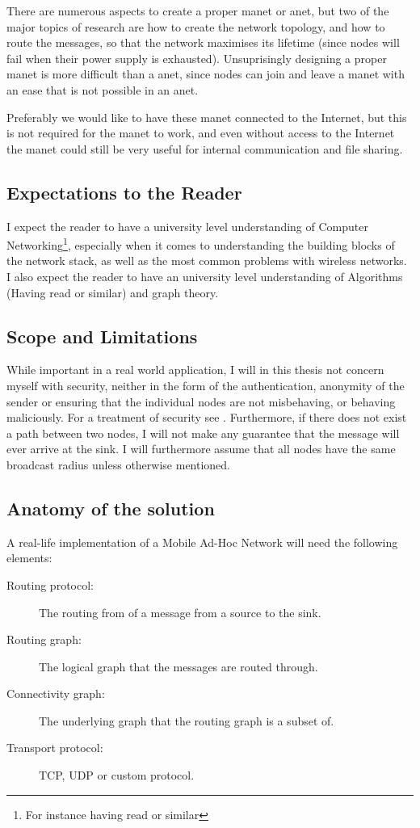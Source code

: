 There are numerous aspects to create a proper \ac{manet} or \ac{anet}, but two of the major topics of research are how to create the network topology, and how to route the messages, so that the network maximises its lifetime (since nodes will fail when their power supply is exhausted). Unsuprisingly designing a proper \ac{manet} is more difficult than a \ac{anet}, since nodes can join and leave a \ac{manet} with an ease that is not possible in an \ac{anet}. 

Preferably we would like to have these \ac{manet} connected to the Internet, but this is not required for the \ac{manet} to work, and even without access to the Internet the \ac{manet} could still be very useful for internal communication and file sharing. 
 

\subsection{Expectations to the Reader}
I expect the reader to have a university level understanding of Computer Networking\footnote{For instance having read \cite{ComNet} or similar}, especially when it comes to understanding the building blocks of the network stack, as well as the most common problems with wireless networks. I also expect the reader to have an university level understanding of Algorithms (Having read \cite{algo} or similar) and graph theory.

\subsection{Scope and Limitations}
While important in a real world application, I will in this thesis not concern myself with security, neither in the form of the authentication, anonymity of the sender or ensuring that the individual nodes are not misbehaving, or behaving maliciously. For a treatment of security see \cite{trustedRouting}. Furthermore, if there does not exist a path between two nodes, I will not make any guarantee that the message will ever arrive at the sink. I will furthermore assume that all nodes have the same broadcast radius unless otherwise mentioned.

\subsection{Anatomy of the solution}
A real-life implementation of a Mobile Ad-Hoc Network will need the following elements:
\begin{description}
\item[Routing protocol:] The routing from of a message from a source to the sink.
\item[Routing graph:] The logical graph that the messages are routed through.
\item[Connectivity graph:] The underlying graph that the routing graph is a subset of.
\item[Transport protocol:] TCP, UDP or custom protocol.
\end{description}

